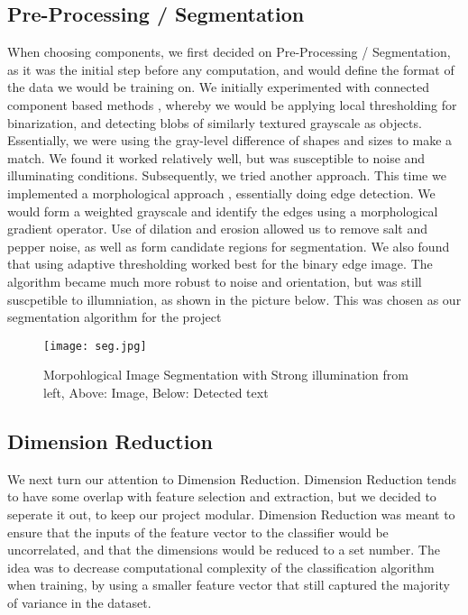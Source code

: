 \subsection{Pre-Processing / Segmentation}
When choosing components, we first decided on Pre-Processing / Segmentation, as it was the initial step before any computation, and would define
the format of the data we would be training on. We initially experimented with connected component based methods \cite{textDetectionSurvey, ohya},
whereby we would be applying local thresholding for binarization, and detecting blobs of similarly textured grayscale as objects. Essentially,
we were using the gray-level difference of shapes and sizes to make a match. We found it worked relatively well, but was susceptible to noise
and illuminating conditions. Subsequently, we tried another approach. This time we implemented a morphological approach \cite{hassan}, essentially
doing edge detection. We would form a weighted grayscale and identify the edges using a morphological gradient operator. Use of dilation and erosion
allowed us to remove salt and pepper noise, as well as form candidate regions for segmentation. We also found that using adaptive thresholding worked
best for the binary edge image. The algorithm became much more robust to noise and orientation, but was still suscpetible to illumniation, as shown
in the picture below. This was chosen as our segmentation algorithm for the project
\begin{figure}[h]
		\texttt{[image: seg.jpg]}\\
		\caption{Morpohlogical Image Segmentation with Strong illumination from left, Above: Image, Below: Detected text}
		\label{fig:seg}
\end{figure}





\subsection{Dimension Reduction}
We next turn our attention to Dimension Reduction. Dimension Reduction tends to have some overlap with feature selection and extraction, but
we decided to seperate it out, to keep our project modular. Dimension Reduction was meant to ensure that the inputs of the feature vector to 
the classifier would be uncorrelated, and that the dimensions would be reduced to a set number. The idea was to decrease computational complexity
of the classification algorithm when training, by using a smaller feature vector that still captured the majority of variance in the dataset.

